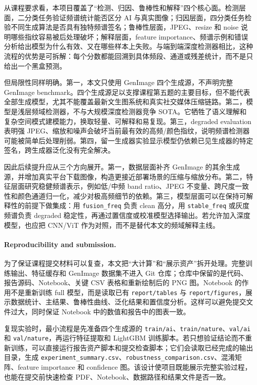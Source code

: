 \documentclass[sigconf,nonacm]{acmart}
\begin{document}
从课程要求看，本项目覆盖了“检测、归因、鲁棒性和解释”四个核心面。检测层面，二分类任务验证频谱统计能否区分 AI 与真实图像；归因层面，四分类任务检验不同生成算法是否具有独特频谱签名；鲁棒性层面，JPEG、resize 和 noise 说明哪些指纹容易被后处理破坏；解释层面，feature importance、频谱示例和错误分析给出模型为什么有效、又在哪些样本上失败。与端到端深度检测器相比，这种流程的优势是可拆解：每个分数都能回溯到具体频段、通道或残差统计，而不是只给出一个黑盒预测。

但局限性同样明确。第一，本文只使用 GenImage 四个生成源，不声明完整 GenImage benchmark。四个生成源足以支撑课程第五题的主要目标，但不能代表全部生成模型，尤其不能覆盖最新文生图系统和真实社交媒体压缩链路。第二，模型是浅层频域检测器，不与大规模深度检测器竞争 SOTA。它牺牲了语义理解和复杂空间模式建模能力，换取轻量、可解释和易复现。第三，degraded evaluation 表明强 JPEG、缩放和噪声会破坏当前最有效的高频/颜色指纹，说明频谱检测器可能被简单后处理削弱。第四，留一生成器实验显示模型仍依赖已见生成器的特定签名，跨生成器泛化没有完全解决。

因此后续提升应从三个方向展开。第一，数据层面补齐 GenImage 的其余生成源，并增加真实平台下载图像，构造更接近部署场景的压缩与缩放分布。第二，特征层面研究稳健频谱表示，例如低/中频 band ratio、JPEG 不变量、跨尺度一致性和颜色通道归一化，减少对极高频细节的依赖。第三，模型层面可以在保持可解释性的前提下做集成：用 \texttt{fusion\_freq} 负责 clean 高分，用 \texttt{stable\_freq} 或灰度频谱负责 degraded 稳定性，再通过置信度或校准模型选择输出。若允许加入深度模型，也应把 CNN/ViT 作为对照，而不是替代本文的频域解释主线。

\paragraph{Reproducibility and submission.}
为了保证课程提交材料可以复查，本文把“大计算”和“展示资产”拆开处理。完整训练输出、特征缓存和 GenImage 数据集不进入 Git 仓库；仓库中保留的是代码、报告源码、Notebook、关键 CSV 表格和重新绘制后的 PNG 图。Notebook 的作用不是重新训练 full 模型，而是读取已有 \texttt{report/tables} 与 \texttt{report/figures}，展示数据统计、主结果、鲁棒性曲线、泛化结果和置信度分析。这样可以避免提交文件过大，同时保证 Notebook 中的数值和报告中的图表一致。

复现实验时，最小流程是先准备四个生成源的 \texttt{train/ai}、\texttt{train/nature}、\texttt{val/ai} 和 \texttt{val/nature}，再运行特征提取和 LightGBM 训练脚本。若只想验证结论而不重新训练，可以直接运行报告资产脚本和提交检查脚本；它们会读取已经完成的输出目录，生成 \texttt{experiment\_summary.csv}、\texttt{robustness\_comparison.csv}、混淆矩阵、feature importance 和 confidence 图。该设计使项目既能展示完整实验过程，也能在提交前快速检查 PDF、Notebook、数据路径和结果文件是否一致。
\end{document}
